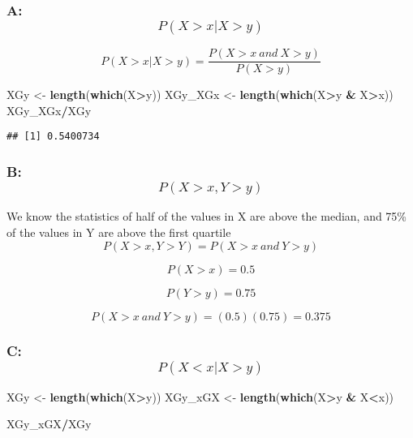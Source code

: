 \documentclass[]{article}
\newenvironment{Shaded}{\begin{snugshade}}{\end{snugshade}}
\newcommand{\KeywordTok}[1]{\textcolor[rgb]{0.13,0.29,0.53}{\textbf{#1}}}
\newcommand{\StringTok}[1]{\textcolor[rgb]{0.31,0.60,0.02}{#1}}
\newcommand{\OperatorTok}[1]{\textcolor[rgb]{0.81,0.36,0.00}{\textbf{#1}}}
\newcommand{\NormalTok}[1]{#1}
\begin{document}
\subsubsection{\texorpdfstring{A:
\[P(X>x|X>y)\]}{A: P(X\textgreater{}x\textbar{}X\textgreater{}y)}}\label{a-pxxxy}

\[
P(X > x | X > y) = \frac{P(X > x \ and \ X > y)}{P(X > y)}
\]

\begin{Shaded}
\begin{Highlighting}[]
\NormalTok{XGy <-}\StringTok{ }\KeywordTok{length}\NormalTok{(}\KeywordTok{which}\NormalTok{(X}\OperatorTok{>}\NormalTok{y))}
\NormalTok{XGy_XGx <-}\StringTok{ }\KeywordTok{length}\NormalTok{(}\KeywordTok{which}\NormalTok{(X}\OperatorTok{>}\NormalTok{y }\OperatorTok{&}\StringTok{ }\NormalTok{X}\OperatorTok{>}\NormalTok{x))}
\NormalTok{XGy_XGx}\OperatorTok{/}\NormalTok{XGy}
\end{Highlighting}
\end{Shaded}

\begin{verbatim}
## [1] 0.5400734
\end{verbatim}

\subsubsection{\texorpdfstring{B:
\[P(X>x , Y>y)\]}{B: P(X\textgreater{}x , Y\textgreater{}y)}}\label{b-pxx-yy}

We know the statistics of half of the values in X are above the median,
and 75\% of the values in Y are above the first quartile \[
P(X > x, Y > Y) = P(X > x \ and \ Y > y)
\]

\[
P(X > x) = 0.5
\]

\[
P(Y > y) = 0.75
\]

\[
P(X > x \ and \ Y > y) = (0.5)(0.75) =0.375
\]

\subsubsection{\texorpdfstring{C:
\[P(X<x|X>y)\]}{C: P(X\textless{}x\textbar{}X\textgreater{}y)}}\label{c-pxxxy}

\begin{Shaded}
\begin{Highlighting}[]
\NormalTok{XGy <-}\StringTok{ }\KeywordTok{length}\NormalTok{(}\KeywordTok{which}\NormalTok{(X}\OperatorTok{>}\NormalTok{y))}
\NormalTok{XGy_xGX <-}\StringTok{ }\KeywordTok{length}\NormalTok{(}\KeywordTok{which}\NormalTok{(X}\OperatorTok{>}\NormalTok{y }\OperatorTok{&}\StringTok{ }\NormalTok{X}\OperatorTok{<}\NormalTok{x))}

\NormalTok{XGy_xGX}\OperatorTok{/}\NormalTok{XGy}
\end{Highlighting}
\end{Shaded}
\end{document}
